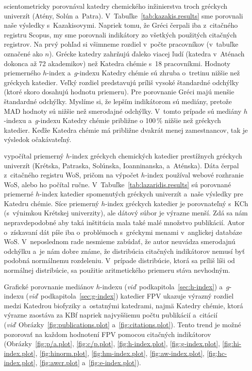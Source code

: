 \citet{Kazakis2015} scientometricky porovnával katedry chemického inžinierstva
troch gréckych univerzít (Atény, Solún a~Patra).
V~Tabuľke~\ref{tab:kazakis.results} sme porovnali naše výsledky s~Kazakisovymi.
Napriek tomu, že Gréci čerpali iba z~citačného registru Scopus, my sme porovnali
indikátory zo všetkých použitých citačných registrov.  Na prvý pohľad si
všimneme rozdiel v~počte pracovníkov (v~tabuľke označené ako $n$).  Grécke
katedry zahrňujú ďaleko viacej ľudí (katedra v~Aténach dokonca až 72 akademikov)
než Katedra chémie s~18 pracovníkmi.  Hodnoty priemerného $h$-index a~$g$-indexu
Katedry chémie sú zhruba o~tretinu nižšie než gréckych katedier.  Veľký rozdiel
predstavujú príliš vysoké štandardné odchýlky (ktoré skoro dosahujú hodnotu
priemeru).  Pre porovnanie Gréci majú menšie štandardné odchýlky.  Myslíme si,
že lepším indikátorom sú mediány, pretože MAD hodnoty sú nižšie než smerodajné
odchýlky.  V~tomto prípade sú mediány $h$-indexu a~$g$-indexu Katedry chémie
približne o 100\,\% nižšie než gréckych katedier.  Keďže Katedra chémie má
približne dvakrát menej zamestnancov, tak je výsledok očakávateľný.

\citet{Lazaridis2010} vypočítal priemerný $h$-index gréckych chemických katedier
prestížnych gréckych univerzít (Krétska, Patraska, Solúnska, Ioanninanska,
a~Aténska).  Dáta čerpal z~citačného registru WoS, pričom na výpočet $h$-index
používal webové rozhranie WoS, alebo ho počítal ručne.
V~Tabuľke~\ref{tab:lazaridis.results} sú porovnané priemerné $h$-index katedier
spomenutých gréckych univerzít a~naše výsledky pre Katedru chémie.  Síce
priemerný $h$-index gréckych katedier je porovnateľný s~KCh (s~výnimkou Krétskej
univerzity), ale dátový súbor je výrazne menší.  Zdá sa nám nepravdepodobné aby
taká inštitúcia mala také malé množstvo publikácií.  Autor o~získavaní dát píše
iba o~problémoch s~gréckymi menami v~anglickej databáze WoS.  V~neposlednom rade
nesmieme zabúdať, že autor neuvádza smerodajnú odchýlku a~je nám dobre známe, že
distribúcia citačných indikátorov nemusí byť podobná normálnemu rozdeleniu.
V~prípade distribúcie, ktorá sa príliš líši od normálnej distribúcie, sa
použitie aritmetického priemeru stáva nevhodným.

Grafické porovnanie mediánov $h$-indexu
(\emph{viď}~podkapitola~\ref{sec:h-index}) a~$g$-indexu
(\emph{viď}~podkapitola~\ref{sec:g-index}) katedier FPV ukazuje výrazný rozdiel
medzi Katedrou biofyziky a~ostatnými katedrami, najmä Katedry chémie, ktorá
výrazne zaostáva za KBf napriek najvyššiemu počtu publikácií a~citácií
(\emph{viď}~Obrázky~\ref{fig:publications.plot} a~\ref{fig:citations.plot}).
Tento trend je možné pozorovať na každom hodnotení FPV pomocou citačných
indikátorov (Obrázky~\ref{fig:p/a.plot}, \ref{fig:c/p.plot},
\ref{fig:h-index.plot}, \ref{fig:g-index.plot}, \ref{fig:hi-index.plot},
\ref{fig:hinorm.plot}, \ref{fig:hm-index.plot}, \ref{fig:aw-index.plot},
\ref{fig:hc-index.plot}, \ref{fig:awcr.plot} a~\ref{fig:e-index.plot}).

